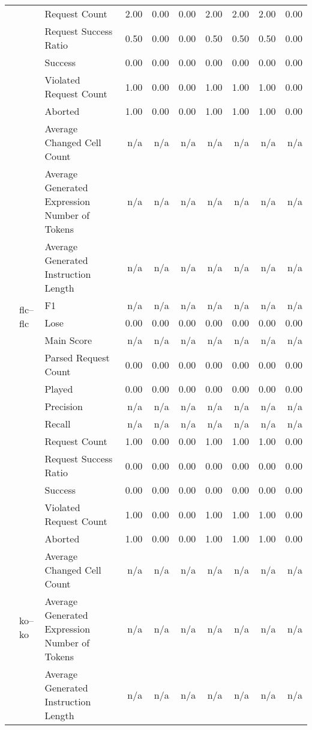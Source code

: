 \begin{tabular}{lllrrrrrrr}
 &  & Request Count & 2.00 & 0.00 & 0.00 & 2.00 & 2.00 & 2.00 & 0.00 \\
 &  & Request Success Ratio & 0.50 & 0.00 & 0.00 & 0.50 & 0.50 & 0.50 & 0.00 \\
 &  & Success & 0.00 & 0.00 & 0.00 & 0.00 & 0.00 & 0.00 & 0.00 \\
 &  & Violated Request Count & 1.00 & 0.00 & 0.00 & 1.00 & 1.00 & 1.00 & 0.00 \\
\cline{2-10}
 & \multirow[t]{15}{*}{flc--flc} & Aborted & 1.00 & 0.00 & 0.00 & 1.00 & 1.00 & 1.00 & 0.00 \\
 &  & Average Changed Cell Count & n/a & n/a & n/a & n/a & n/a & n/a & n/a \\
 &  & Average Generated Expression Number of Tokens & n/a & n/a & n/a & n/a & n/a & n/a & n/a \\
 &  & Average Generated Instruction Length & n/a & n/a & n/a & n/a & n/a & n/a & n/a \\
 &  & F1 & n/a & n/a & n/a & n/a & n/a & n/a & n/a \\
 &  & Lose & 0.00 & 0.00 & 0.00 & 0.00 & 0.00 & 0.00 & 0.00 \\
 &  & Main Score & n/a & n/a & n/a & n/a & n/a & n/a & n/a \\
 &  & Parsed Request Count & 0.00 & 0.00 & 0.00 & 0.00 & 0.00 & 0.00 & 0.00 \\
 &  & Played & 0.00 & 0.00 & 0.00 & 0.00 & 0.00 & 0.00 & 0.00 \\
 &  & Precision & n/a & n/a & n/a & n/a & n/a & n/a & n/a \\
 &  & Recall & n/a & n/a & n/a & n/a & n/a & n/a & n/a \\
 &  & Request Count & 1.00 & 0.00 & 0.00 & 1.00 & 1.00 & 1.00 & 0.00 \\
 &  & Request Success Ratio & 0.00 & 0.00 & 0.00 & 0.00 & 0.00 & 0.00 & 0.00 \\
 &  & Success & 0.00 & 0.00 & 0.00 & 0.00 & 0.00 & 0.00 & 0.00 \\
 &  & Violated Request Count & 1.00 & 0.00 & 0.00 & 1.00 & 1.00 & 1.00 & 0.00 \\
\cline{2-10}
 & \multirow[t]{15}{*}{ko--ko} & Aborted & 1.00 & 0.00 & 0.00 & 1.00 & 1.00 & 1.00 & 0.00 \\
 &  & Average Changed Cell Count & n/a & n/a & n/a & n/a & n/a & n/a & n/a \\
 &  & Average Generated Expression Number of Tokens & n/a & n/a & n/a & n/a & n/a & n/a & n/a \\
 &  & Average Generated Instruction Length & n/a & n/a & n/a & n/a & n/a & n/a & n/a \\

\end{tabular}
